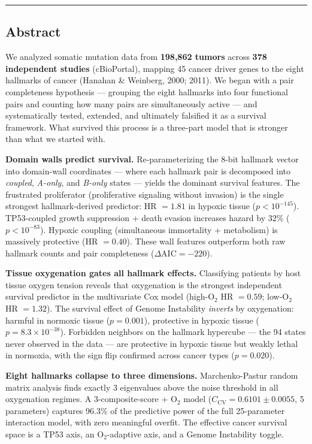 \documentclass[
  11pt,
]{article}
\begin{document}
\begin{center}\rule{0.5\linewidth}{0.5pt}\end{center}

\subsection{Abstract}\label{abstract}

We analyzed somatic mutation data from \textbf{198,862 tumors} across
\textbf{378 independent studies} (cBioPortal), mapping 45 cancer driver
genes to the eight hallmarks of cancer (Hanahan \& Weinberg, 2000;
2011). We began with a pair completeness hypothesis --- grouping the
eight hallmarks into four functional pairs and counting how many pairs
are simultaneously active --- and systematically tested, extended, and
ultimately falsified it as a survival framework. What survived this
process is a three-part model that is stronger than what we started
with.

\textbf{Domain walls predict survival.} Re-parameterizing the 8-bit
hallmark vector into domain-wall coordinates --- where each hallmark
pair is decomposed into \emph{coupled}, \emph{A-only}, and \emph{B-only}
states --- yields the dominant survival features. The frustrated
proliferator (proliferative signaling without invasion) is the single
strongest hallmark-derived predictor: HR \(= 1.81\) in hypoxic tissue
(\(p < 10^{-145}\)). TP53-coupled growth suppression + death evasion
increases hazard by 32\% (\(p < 10^{-83}\)). Hypoxic coupling
(simultaneous immortality + metabolism) is massively protective (HR
\(= 0.40\)). These wall features outperform both raw hallmark counts and
pair completeness (\(\Delta\mathrm{AIC} = -220\)).

\textbf{Tissue oxygenation gates all hallmark effects.} Classifying
patients by host tissue oxygen tension reveals that oxygenation is the
strongest independent survival predictor in the multivariate Cox model
(high-O\(_2\) HR \(= 0.59\); low-O\(_2\) HR \(= 1.32\)). The survival
effect of Genome Instability \emph{inverts} by oxygenation: harmful in
normoxic tissue (\(p = 0.001\)), protective in hypoxic tissue
(\(p = 8.3 \times 10^{-38}\)). Forbidden neighbors on the hallmark
hypercube --- the 94 states never observed in the data --- are
protective in hypoxic tissue but weakly lethal in normoxia, with the
sign flip confirmed across cancer types (\(p = 0.020\)).

\textbf{Eight hallmarks collapse to three dimensions.} Marchenko-Pastur
random matrix analysis finds exactly 3 eigenvalues above the noise
threshold in all oxygenation regimes. A 3-composite-score + O\(_2\)
model (\(C_\mathrm{CV} = 0.6101 \pm 0.0055\), 5 parameters) captures
96.3\% of the predictive power of the full 25-parameter interaction
model, with zero meaningful overfit. The effective cancer survival space
is a TP53 axis, an O\(_2\)-adaptive axis, and a Genome Instability
toggle.
\end{document}
